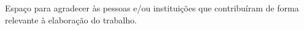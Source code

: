 \begin{agradecimentos}

Espaço para agradecer às pessoas e/ou instituições que contribuíram de forma relevante à elaboração do trabalho.

\end{agradecimentos}
